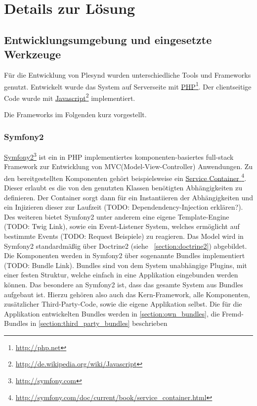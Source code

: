 \chapter{Details zur Lösung} 
\label{Kapitel 6}

\section{Entwicklungsumgebung und eingesetzte Werkzeuge}\label{section:entwicklungsumgebungen_tools}
Für die Entwicklung von Plesynd wurden unterschiedliche Tools und Frameworks genutzt. Entwickelt wurde das System auf Serverseite mit \href{http://php.net}{PHP}\footnote{\url{http://php.net}}. Der clientseitige Code wurde mit \href{http://de.wikipedia.org/wiki/Javascript}{Javascript}\footnote{\url{http://de.wikipedia.org/wiki/Javascript}} implementiert. 

Die Frameworks im Folgenden kurz vorgestellt.

\subsection{Symfony2}
\href{http://symfony.com}{Symfony2}\footnote{\url{http://symfony.com}} ist ein in PHP implementiertes komponenten-basiertes full-stack Framework zur Entwicklung von MVC(Model-View-Controller) Anwendungen. Zu den bereitgestellten Komponenten gehört beispielsweise ein \href{http://symfony.com/doc/current/book/service_container.html}{Service Container }\footnote{\url{http://symfony.com/doc/current/book/service_container.html}}. Dieser erlaubt es die von den genutzten Klassen benötigten Abhängigkeiten zu definieren. Der Container sorgt dann für ein Instantiieren der Abhängigkeiten und ein Injizieren dieser zur Laufzeit (TODO: Dependendency-Injection erklären?). Des weiteren bietet Symfony2 unter anderem eine eigene Template-Engine (TODO: Twig Link), sowie ein Event-Listener System, welches ermöglicht auf bestimmte Events (TODO: Request Beispiele) zu reagieren. Das Model wird in Symfony2 standardmäßig über Doctrine2 (siehe ~\ref{section:doctrine2}) abgebildet.
Die Komponenten werden in Symfony2 über sogenannte Bundles implementiert (TODO: Bundle Link). Bundles sind von dem System unabhängige Plugins, mit einer festen Struktur, welche einfach in eine Applikation eingebunden werden können. Das besondere an Symfony2 ist, dass das gesamte System aus Bundles aufgebaut ist. Hierzu gehören also auch das Kern-Framework, alle Komponenten, zusätzlicher Third-Party-Code, sowie die eigene Applikation selbst. Die für die Applikation entwickelten Bundles werden in \ref{section:own_bundles}, die Fremd-Bundles in \ref{section:third_party_bundles} beschrieben

